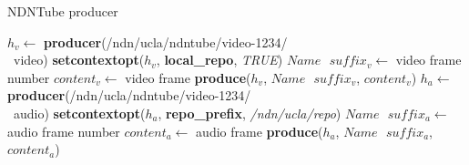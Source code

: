 \begin{algorithm}[ht]
\caption{NDNTube producer}
\label{alg:recordproducer}
\begin{algorithmic}[3]
\State $h_v \leftarrow $ \textbf{producer}(/ndn/ucla/ndntube/video-1234/ \\\ video)
\State \textbf{setcontextopt}($h_v$, \textbf{local\_repo}, \textit{TRUE})
\vspace{0.2cm}
	\State $Name \textbf{ } suffix_v \leftarrow $ video frame number
	\State $content_v \leftarrow $ video frame
	\State \textbf{produce}($h_v$, $Name\textbf{ }suffix_v$, $content_v$)
	\EndWhile
\vspace{0.2cm}
\vspace{0.2cm}
\State $h_a \leftarrow $ \textbf{producer}(/ndn/ucla/ndntube/video-1234/ \\\ audio)
\State \textbf{setcontextopt}($h_a$, \textbf{repo\_prefix}, \textit{/ndn/ucla/repo})
\vspace{0.2cm}
	\State $Name \textbf{ } suffix_a \leftarrow $ audio frame number
	\State $content_a \leftarrow $ audio frame
	\State \textbf{produce}($h_a$, $Name\textbf{ }suffix_a$, $content_a$)
	\EndWhile
\end{algorithmic}
\end{algorithm}

